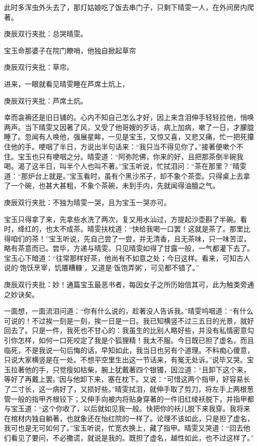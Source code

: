 \begin{parag}


    此时多浑虫外头去了，那灯姑娘吃了饭去串门子，只剩下晴雯一人，在外间房内爬著。\begin{note}庚辰双行夹批：总哭晴雯。\end{note}宝玉命那婆子在院门瞭哨，他独自掀起草帘\begin{note}庚辰双行夹批：草帘。\end{note}进来，一眼就看见晴雯睡在芦席土炕上，\begin{note}庚辰双行夹批：芦席土炕。\end{note}幸而衾褥还是旧日铺的。心内不知自己怎么才好，因上来含泪伸手轻轻拉他，悄唤两声。当下晴雯又因著了风，又受了他哥嫂的歹话，病上加病，嗽了一日，才朦胧睡了。忽闻有人唤他，强展星眸，一见是宝玉，又惊又喜，又悲又痛，忙一把死攥住他的手。哽咽了半日，方说出半句话来：“我只当不得见你了。”接著便嗽个不住。宝玉也只有哽咽之分。晴雯道：“阿弥陀佛，你来的好，且把那茶倒半碗我喝。渴了这半日，叫半个人也叫不著。”宝玉听说，忙拭泪问：“茶在那里？”晴雯道：“那炉台上就是。”宝玉看时，虽有个黑沙吊子，却不象个茶壶。只得桌上去拿了一个碗，也甚大甚粗，不象个茶碗，未到手内，先就闻得油膻之气。\begin{note}庚辰双行夹批：不独为晴雯一哭，且为宝玉一哭亦可。\end{note}宝玉只得拿了来，先拿些水洗了两次，复又用水汕过，方提起沙壶斟了半碗。看时，绛红的，也太不成茶。晴雯扶枕道：“快给我喝一口罢！这就是茶了。那里比得咱们的茶！”宝玉听说，先自己尝了一尝，并无清香，且无茶味，只一味苦涩，略有茶意而已。尝毕，方递与晴雯。只见晴雯如得了甘露一般，一气都灌下去了。宝玉心下暗道：“往常那样好茶，他尚有不如意之处；今日这样。看来，可知古人说的‘饱饫烹宰，饥餍糟糠’，又道是‘饭饱弄粥’，可见都不错了。”\begin{note}庚辰双行夹批：妙！通篇宝玉最恶书者，每因女子之所历始信其可，此为触类旁通之妙诀矣。\end{note}一面想，一面流泪问道：“你有什么说的，趁著没人告诉我。”晴雯呜咽道：“有什么可说的！不过挨一刻是一刻，挨一日是一日。我已知横竖不过三五日的光景，就好回去了。只是一件，我死也不甘心的：我虽生的比别人略好些，并没有私情密意勾引你怎样，如何一口死咬定了我是个狐狸精！我太不服。今日既已担了虚名，而且临死，不是我说一句后悔的话，早知如此，我当日也另有个道理。不料痴心傻意，只说大家横竖是在一处。不想平空里生出这一节话来，有冤无处诉。”说毕又哭。宝玉拉著他的手，只觉瘦如枯柴，腕上犹戴著四个银镯，因泣道：“且卸下这个来，等好了再戴上罢。”因与他卸下来，塞在枕下。又说：“可惜这两个指甲，好容易长了二寸长，这一病好了，又损好些。”晴雯拭泪，就伸手取了剪刀，将左手上两根葱管一般的指甲齐根铰下；又伸手向被内将贴身穿著的一件旧红绫袄脱下，并指甲都与宝玉道：“这个你收了，以后就如见我一般。快把你的袄儿脱下来我穿。我将来在棺材内独自躺著，也就象还在怡红院的一样了。论理不该如此，只是担了虚名，我可也是无可如何了。”宝玉听说，忙宽衣换上，藏了指甲。晴雯又哭道：“回去他们看见了要问，不必撒谎，就说是我的。既担了虚名，越性如此，也不过这样了。”
\end{parag}


